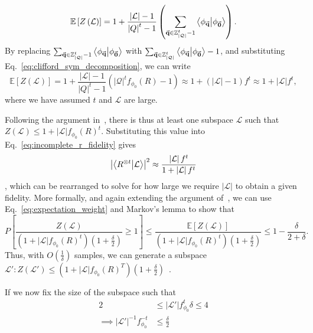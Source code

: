 \begin{equation}
\mathbb{E}\left[Z\left(\mathcal{L}\right)\right] = 1 + \frac{\left|\mathcal{L}\right|-1}{\left|Q\right|^{t}-1}\left(\sum_{\va{q}\in\mathbb{Z}_{\left|\mathcal{Q}\right|}^{t}-1}\braket{\phi_{\va{q}}}{\phi_{\va{0}}}\right).
\end{equation}
By replacing $\sum_{\va{q}\in\mathbb{Z}_{\left|\mathcal{Q}\right|}^{t}-1}\braket{\phi_{\va{q}}}{\phi_{\va{0}}}$ with $\sum_{\va{q}\in\mathbb{Z}_{\left|\mathcal{Q}\right|}^{t}}\braket{\phi_{\va{q}}}{\phi_{\va{0}}} -1$, and substituting Eq.~\ref{eq:clifford_sym_decomposition}, we can write
\begin{equation}
\mathbb{E}\left[Z\left(\mathcal{L}\right)\right] = 1 + \frac{\left|\mathcal{L}\right|-1}{\left|Q\right|^{t}-1}\left(\left|\mathcal{Q}\right|^{t}f_{\phi_{0}}\left(R\right)-1\right)\approx 1+\left(\left|\mathcal{L}\right|-1\right)f^{t}\approx 1+\left|\mathcal{L}\right|f^{t},
\label{eq:expectation_weight}
\end{equation}
where we have assumed $t$ and $\mathcal{L}$ are large.\par
Following the argument in~\cite{Bravyi2016}, there is thus at least one subspace $\mathcal{L}$ such that $Z\left(\mathcal{L}\right)\leq 1+\left|\mathcal{L}\right|f_{\phi_{0}}(R)^{t}$. Substituting this value into Eq.~\ref{eq:incomplete_r_fidelity} gives
\[
\left|\braket{R^{\otimes t}}{\mathcal{L}}\right|^{2} \approx \frac{\left|\mathcal{L}\right|f^{t}}{1+\left|\mathcal{L}\right|f^{t}}
\],
which can be rearranged to solve for how large we require $\left|\mathcal{L}\right|$ to obtain a given fidelity. More formally, and again extending the argument of~\cite{Bravyi2016}, we can use Eq.~\ref{eq:expectation_weight} and Markov's lemma to show that
\[P\left[ \frac{Z\left(\mathcal{L}\right)}{\left(1+\left|\mathcal{L}\right|f_{\phi_{0}}(R)^{t}\right)(1+\frac{\delta}{2})}\geq 1 \right] \leq \frac{\mathbb{E}\left[Z(\mathcal{L})\right]}{\left(1+\left|\mathcal{L}\right|f_{\phi_{0}}(R)^{t}\right)(1+\frac{\delta}{2})}\leq 1 - \frac{\delta}{2+\delta}.\]
Thus, with $O(\frac{1}{\delta})$ samples, we can generate a subspace $\mathcal{L'}:Z\left(\mathcal{L'}\right)\leq \left(1+\left|\mathcal{L}\right|f_{\phi_{0}}(R)^{T}\right)\left(1+\frac{\delta}{2}\right)$~\cite{Bravyi2016}.\par
If we now fix the size of the subspace such that
\begin{align*}
2&\leq \left|\mathcal{L'}\right|f_{\phi_{0}}^{t}\delta \leq 4 \\
\implies \left|\mathcal{L'}\right|^{-1}f_{\phi_{0}}^{-t}&\leq \frac{\delta}{2}
\end{align*}

